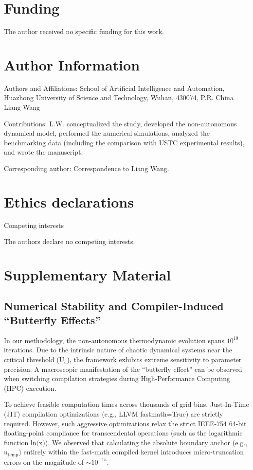 \section*{Funding}

The author received no specific funding for this work.

\section*{Author Information}

Authors and Affiliations: School of Artificial Intelligence and
Automation, Huazhong University of Science and Technology, Wuhan,
430074, P.R. China Liang Wang

Contributions: L.W. conceptualized the study, developed the
non-autonomous dynamical model, performed the numerical simulations,
analyzed the benchmarking data (including the comparison with USTC
experimental results), and wrote the manuscript.

Corresponding author: Correspondence to Liang Wang.

\section*{Ethics declarations}

Competing interests

The authors declare no competing interests.

\section*{Supplementary Material}

\subsection*{Numerical Stability and Compiler-Induced ``Butterfly Effects''}

In our methodology, the non-autonomous thermodynamic evolution spans
\(\text{10}^{\text{10}}\) iterations. Due to the intrinsic nature of
chaotic dynamical systems near the critical threshold
(\(\text{U}_{\text{c}}\)), the framework exhibits extreme sensitivity to
parameter precision. A macroscopic manifestation of the ``butterfly
effect'' can be observed when switching compilation strategies during
High-Performance Computing (HPC) execution.

To achieve feasible computation times across thousands of grid bins,
Just-In-Time (JIT) compilation optimizations (e.g., LLVM fastmath=True)
are strictly required. However, such aggressive optimizations relax the
strict IEEE-754 64-bit floating-point compliance for transcendental
operations (such as the logarithmic function
\(\text{ln(}\text{x}\text{)}\)). We observed that calculating the
absolute boundary anchor (e.g., \(\text{u}_{\text{temp}}\)) entirely
within the fast-math compiled kernel introduces micro-truncation errors
on the magnitude of \(\text{∼}\text{10}^{\text{−15}}\).

